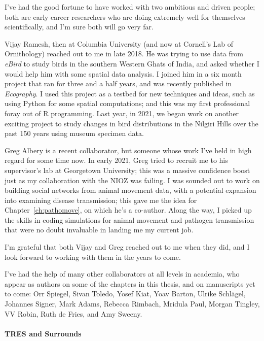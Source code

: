 \medskip

I've had the good fortune to have worked with two ambitious and driven people; both are early career researchers who are doing extremely well for themselves scientifically, and I'm sure both will go very far.

Vijay Ramesh, then at Columbia University (and now at Cornell's Lab of Ornithology) reached out to me in late 2018.
He was trying to use data from \textit{eBird} to study birds in the southern Western Ghats of India, and asked whether I would help him with some spatial data analysis.
I joined him in a six month project that ran for three and a half years, and was recently published in \textit{Ecography}.
I used this project as a testbed for new techniques and ideas, such as using Python for some spatial computations; and this was my first professional foray out of R programming.
Last year, in 2021, we began work on another exciting project to study changes in bird distributions in the Nilgiri Hills over the past 150 years using museum specimen data.

Greg Albery is a recent collaborator, but someone whose work I've held in high regard for some time now.
In early 2021, Greg tried to recruit me to his supervisor's lab at Georgetown University; this was a massive confidence boost just as my collaboration with the NIOZ was failing.
I was sounded out to work on building social networks from animal movement data, with a potential expansion into examining disease transmission; this gave me the idea for Chapter~\ref{ch:pathomove}, on which he's a co-author.
Along the way, I picked up the skills in coding simulations for animal movement and pathogen transmission that were no doubt invaluable in landing me my current job.

I'm grateful that both Vijay and Greg reached out to me when they did, and I look forward to working with them in the years to come.

I've had the help of many other collaborators at all levels in academia, who appear as authors on some of the chapters in this thesis, and on manuscripts yet to come: Orr Spiegel, Sivan Toledo, Yosef Kiat, Yoav Barton, Ulrike Schl{\"a}gel, Johannes Signer, Mark Adams, Rebecca Rimbach, Mridula Paul, Morgan Tingley, VV Robin, Ruth de Fries, and Amy Sweeny.

\paragraph*{TRES and Surrounds}

